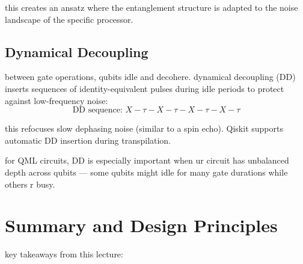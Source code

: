 \documentclass[11pt,a4paper]{article}
\theoremstyle{definition}
\theoremstyle{remark}
\begin{document}
this creates an ansatz where the entanglement structure is adapted to the noise landscape of the specific processor.

\subsection{Dynamical Decoupling}

between gate operations, qubits idle and decohere. dynamical decoupling (DD) inserts sequences of identity-equivalent pulses during idle periods to protect against low-frequency noise:
\[
\text{DD sequence: } X - \tau - X - \tau - X - \tau - X - \tau
\]

this refocuses slow dephasing noise (similar to a spin echo). Qiskit supports automatic DD insertion during transpilation.

for QML circuits, DD is especially important when ur circuit has unbalanced depth across qubits --- some qubits might idle for many gate durations while others r busy.

\section{Summary and Design Principles}

key takeaways from this lecture:
\end{document}
